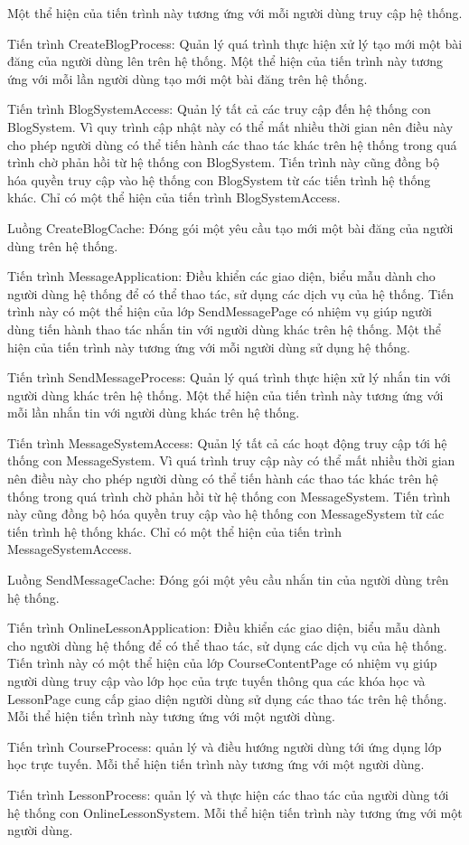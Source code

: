 \documentclass[./../main_file.tex]{subfiles}
\begin{document}
\begin{description}
Một thể hiện của tiến trình này tương ứng với mỗi người dùng truy cập hệ thống.
\item Tiến trình CreateBlogProcess: Quản lý quá trình thực hiện xử lý tạo mới một bài đăng của người dùng lên trên hệ thống.
Một thể hiện của tiến trình này tương ứng với mỗi lần người dùng tạo mới một bài đăng trên hệ thống.
\item Tiến trình BlogSystemAccess: Quản lý tất cả các truy cập đến hệ thống con BlogSystem. Vì quy trình cập nhật này có thể mất nhiều thời gian nên điều này cho phép người dùng có thể tiến hành các thao tác khác trên hệ thống trong quá trình chờ phản hồi từ hệ thống con BlogSystem. Tiến trình này cũng đồng bộ hóa quyền truy cập vào hệ thống con BlogSystem từ các tiến trình hệ thống khác.
Chỉ có một thể hiện của tiến trình BlogSystemAccess.
\item Luồng CreateBlogCache: Đóng gói một yêu cầu tạo mới một bài đăng của người dùng trên hệ thống.
\item Tiến trình MessageApplication: Điều khiển các giao diện, biểu mẫu dành cho người dùng hệ thống để có thể thao tác, sử dụng các dịch vụ của hệ thống. Tiến trình này có một thể hiện của lớp SendMessagePage có nhiệm vụ giúp người dùng tiến hành thao tác nhắn tin với người dùng khác trên hệ thống.
Một thể hiện của tiến trình này tương ứng với mỗi người dùng sử dụng hệ thống.
\item Tiến trình SendMessageProcess: Quản lý quá trình thực hiện xử lý nhắn tin với người dùng khác trên hệ thống.
Một thể hiện của tiến trình này tương ứng với mỗi lần nhắn tin với người dùng khác trên hệ thống.
\item Tiến trình MessageSystemAccess: Quản lý tất cả các hoạt động truy cập tới hệ thống con MessageSystem. Vì quá trình truy cập này có thể mất nhiều thời gian nên điều này cho phép người dùng có thể tiến hành các thao tác khác trên hệ thống trong quá trình chờ phản hồi từ hệ thống con MessageSystem. Tiến trình này cũng đồng bộ hóa quyền truy cập vào hệ thống con MessageSystem từ các tiến trình hệ thống khác.
Chỉ có một thể hiện của tiến trình MessageSystemAccess.
\item Luồng SendMessageCache: Đóng gói một yêu cầu nhắn tin của người dùng trên hệ thống.
\item Tiến trình OnlineLessonApplication: Điều khiển các giao diện, biểu mẫu dành cho người dùng hệ thống để có thể thao tác, sử dụng các dịch vụ của hệ thống. Tiến trình này có một thể hiện của lớp CourseContentPage có nhiệm vụ giúp người dùng truy cập vào lớp học của trực tuyến thông qua các khóa học và LessonPage cung cấp giao diện người dùng sử dụng các thao tác trên hệ thống.
Mỗi thể hiện tiến trình này tương ứng với một người dùng.
\item Tiến trình CourseProcess: quản lý và điều hướng người dùng tới ứng dụng lớp học trực tuyến.
Mỗi thể hiện tiến trình này tương ứng với một người dùng.
\item Tiến trình LessonProcess: quản lý và thực hiện các thao tác của người dùng tới  hệ thống con OnlineLessonSystem.
Mỗi thể hiện tiến trình này tương ứng với một người dùng.


\end{description}
\end{document}
